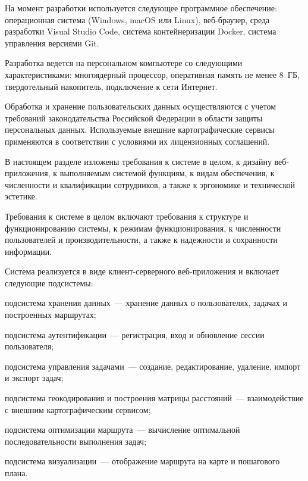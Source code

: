 На момент разработки используется следующее программное обеспечение: операционная
система (Windows, macOS или Linux), веб-браузер, среда разработки Visual Studio Code,
система контейнеризации Docker, система управления версиями Git.

Разработка ведется на персональном компьютере со следующими характеристиками:
многоядерный процессор, оперативная память не менее 8~ГБ, твердотельный накопитель,
подключение к сети Интернет.

Обработка и хранение пользовательских данных осуществляются с учетом требований
законодательства Российской Федерации в области защиты персональных данных.
Используемые внешние картографические сервисы применяются в соответствии с условиями
их лицензионных соглашений.

В настоящем разделе изложены требования к системе в целом, к дизайну веб-приложения, к
выполняемым системой функциям, к видам обеспечения, к численности и квалификации
сотрудников, а также к эргономике и технической эстетике.

Требования к системе в целом включают требования к структуре и функционированию системы,
к режимам функционирования, к численности пользователей и производительности, а также к
надежности и сохранности информации.

Система реализуется в виде клиент-серверного веб-приложения и включает следующие
подсистемы:
\begin{compactlist}
  \item подсистема хранения данных~--- хранение данных о пользователях, задачах и построенных маршрутах;
  \item подсистема аутентификации~--- регистрация, вход и обновление сессии пользователя;
  \item подсистема управления задачами~--- создание, редактирование, удаление, импорт и экспорт задач;
  \item подсистема геокодирования и построения матрицы расстояний~--- взаимодействие с внешним картографическим сервисом;
  \item подсистема оптимизации маршрута~--- вычисление оптимальной последовательности выполнения задач;
  \item подсистема визуализации~--- отображение маршрута на карте и пошагового плана.
\end{compactlist}

